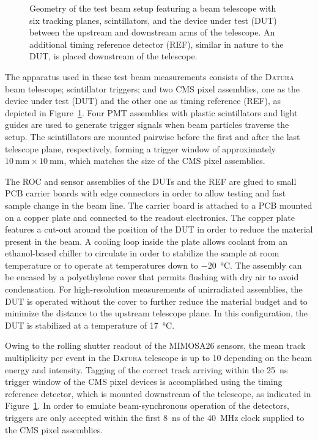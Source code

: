 \documentclass[a4paper,11pt]{article}
\newcommand{\datura}{\textsc{Datura}\xspace}
\begin{document}
\begin{figure}[tbp]
  
  \caption[Geometry of the test beam setup]{Geometry of the test beam setup featuring a beam telescope with six tracking planes, scintillators, and the device under test (DUT) between the upstream and downstream arms of the telescope. An additional timing reference detector (REF), similar in nature to the DUT, is placed downstream of the telescope.}
  \label{fig:telescope}
\end{figure}

The apparatus used in these test beam measurements consists of the \datura beam telescope; scintillator triggers; and two CMS pixel assemblies, one as the device under test (DUT) and the other one as timing reference (REF), as depicted in Figure~\ref{fig:telescope}.
Four PMT assemblies with plastic scintillators and light guides are used to generate trigger signals when beam particles traverse the setup.
The scintillators are mounted pairwise before the first and after the last telescope plane, respectively, forming a trigger window of approximately $\SI{10}{\milli\meter} \times \SI{10}{\milli\meter}$, which matches the size of the CMS pixel assemblies.

The ROC and sensor assemblies of the DUTs and the REF are glued to small PCB carrier boards with edge connectors in order to  allow testing and fast sample change in the beam line.
The carrier board is attached to a PCB mounted on a copper plate and connected to the readout electronics.
The copper plate features a cut-out around the position of the DUT in order to reduce the material present in the beam.
A cooling loop inside the plate allows coolant from an ethanol-based chiller to circulate in order to stabilize the sample at room temperature or to operate at temperatures down to \SI{-20}{\celsius}.
The assembly can be encased by a polyethylene cover that permits flushing with dry air to avoid condensation.
For high-resolution measurements of unirradiated assemblies, the DUT is operated without the cover to further reduce the material budget and to minimize the distance to the upstream telescope plane.
In this configuration, the DUT is stabilized at a temperature of \SI{17}{\celsius}.

Owing to the rolling shutter readout of the MIMOSA26 sensors, the mean track multiplicity per event in the \datura telescope is up to 10 depending on the beam energy and intensity.
Tagging of the correct track arriving within the \SI{25}{\nano\second} trigger window of the CMS pixel devices is accomplished using the timing reference detector, which is mounted downstream of the telescope, as indicated in Figure~\ref{fig:telescope}.
In order to emulate beam-synchronous operation of the detectors, triggers are only accepted within the first \SI{8}{\ns} of the \SI{40}{\MHz} clock supplied to the CMS pixel assemblies.
\end{document}
